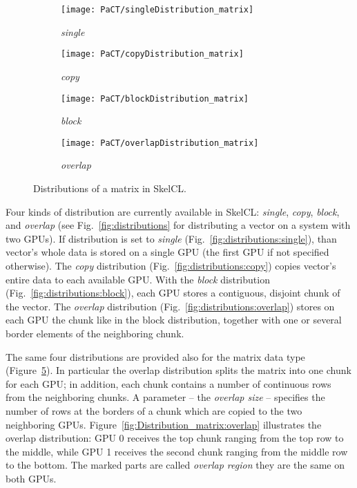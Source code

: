 \begin{figure}[tbp]
  \centering
  \begin{subfigure}{.22\textwidth}
    \texttt{[image: PaCT/singleDistribution\_matrix]}
    \caption{\emph{single}}
    \label{fig:Distribution_matrixs:single}
  \end{subfigure}
  \hfill
  \begin{subfigure}{.22\textwidth}
    \texttt{[image: PaCT/copyDistribution\_matrix]}
    \caption{\emph{copy}}
    \label{fig:Distribution_matrixs:copy}
  \end{subfigure}
  \hfill
  \begin{subfigure}{.22\textwidth}
    \texttt{[image: PaCT/blockDistribution\_matrix]}
    \caption{\emph{block}}
    \label{fig:Distribution_matrixs:block}
  \end{subfigure}
  \hfill
  \begin{subfigure}{.22\textwidth}
    \texttt{[image: PaCT/overlapDistribution\_matrix]}
    \caption{\emph{overlap}}
    \label{fig:Distribution_matrixs:overlap}
  \end{subfigure}
  \caption{Distributions of a matrix in SkelCL.}
  \label{fig:distributions_matrix}
\end{figure}


Four kinds of distribution are currently available in SkelCL:
\emph{single}, \emph{copy}, \emph{block}, and \emph{overlap} (see Fig.~\ref{fig:distributions} for distributing a vector on a system with two GPUs).
If distribution is set to \emph{single} (Fig.~\ref{fig:distributions:single}), than vector's whole data is stored on a single GPU (the first GPU if not specified otherwise).
The \emph{copy} distribution (Fig.~\ref{fig:distributions:copy}) copies vector's entire data to each available GPU.
With the \emph{block} distribution (Fig.~\ref{fig:distributions:block}), each GPU stores a contiguous, disjoint chunk of the vector.
The \emph{overlap} distribution (Fig.~\ref{fig:distributions:overlap}) stores on each GPU the chunk like in the block distribution, together with one or several border elements of the neighboring chunk.

The same four distributions are provided also for the matrix data type (Figure~\ref{fig:distributions_matrix}). In particular the overlap distribution splits the matrix into one chunk for each GPU;
in addition, each chunk contains a number of continuous rows from the neighboring chunks.
A parameter -- the \emph{overlap size} -- specifies the number of rows at the borders of a chunk which are copied to the two neighboring GPUs.
Figure~\ref{fig:Distribution_matrix:overlap} illustrates the overlap distribution:
GPU 0 receives the top chunk ranging from the top row to the middle, while GPU 1 receives the second chunk ranging from the middle row to the bottom.
The marked parts are called \emph{overlap region} they are the same on both GPUs.

